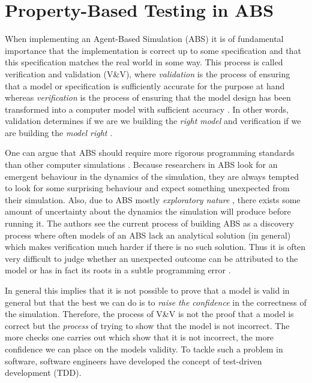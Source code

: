\chapter{Property-Based Testing in ABS}
\label{ch:property}

When implementing an Agent-Based Simulation (ABS) it is of fundamental importance that the implementation is correct up to some specification and that this specification matches the real world in some way. This process is called verification and validation (V\&V), where \textit{validation} is the process of ensuring that a model or specification is sufficiently accurate for the purpose at hand whereas \textit{verification} is the process of ensuring that the model design has been transformed into a computer model with sufficient accuracy \cite{robinson_simulation:_2014}. In other words, validation determines if we are we building the \textit{right model} and verification if we are building the \textit{model right} \cite{balci_verification_1998}.

One can argue that ABS should require more rigorous programming standards than other computer simulations \cite{polhill_ghost_2005}. Because researchers in ABS look for an emergent behaviour in the dynamics of the simulation, they are always tempted to look for some surprising behaviour and expect something unexpected from their simulation. 
Also, due to ABS mostly \textit{exploratory nature} \cite{epstein_chapter_2006, epstein_generative_2012}, there exists some amount of uncertainty about the dynamics the simulation will produce before running it. The authors \cite{ormerod_validation_2006} see the current process of building ABS as a discovery process where often models of an ABS lack an analytical solution (in general) which makes verification much harder if there is no such solution. Thus it is often very difficult to judge whether an unexpected outcome can be attributed to the model or has in fact its roots in a subtle programming error \cite{galan_errors_2009}.

In general this implies that it is not possible to prove that a model is valid in general but that the best we can do is to \textit{raise the confidence} in the correctness of the simulation. Therefore, the process of V\&V is not the proof that a model is correct but the \textit{process} of trying to show that the model is not incorrect. The more checks one carries out which show that it is not incorrect, the more confidence we can place on the models validity. To tackle such a problem in software, software engineers have developed the concept of test-driven development (TDD).

